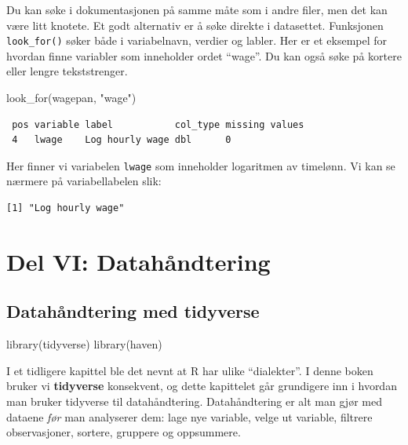 \documentclass[
  norsk,
  letterpaper,
  DIV=11,
  numbers=noendperiod]{scrreprt}
\newenvironment{Shaded}{\begin{snugshade}}{\end{snugshade}}
\newcommand{\FunctionTok}[1]{\textcolor[rgb]{0.28,0.35,0.67}{#1}}
\newcommand{\NormalTok}[1]{\textcolor[rgb]{0.00,0.23,0.31}{#1}}
\newcommand{\SpecialCharTok}[1]{\textcolor[rgb]{0.37,0.37,0.37}{#1}}
\newcommand{\StringTok}[1]{\textcolor[rgb]{0.13,0.47,0.30}{#1}}
\theoremstyle{definition}
\theoremstyle{remark}
\begin{document}
Du kan søke i dokumentasjonen på samme måte som i andre filer, men det
kan være litt knotete. Et godt alternativ er å søke direkte i
datasettet. Funksjonen \texttt{look\_for()} søker både i variabelnavn,
verdier og labler. Her er et eksempel for hvordan finne variabler som
inneholder ordet ``wage''. Du kan også søke på kortere eller lengre
tekststrenger.

\begin{Shaded}
\begin{Highlighting}[]
\FunctionTok{look\_for}\NormalTok{(wagepan, }\StringTok{"wage"}\NormalTok{)}
\end{Highlighting}
\end{Shaded}

\begin{verbatim}
 pos variable label           col_type missing values
 4   lwage    Log hourly wage dbl      0             
\end{verbatim}

Her finner vi variabelen \texttt{lwage} som inneholder logaritmen av
timelønn. Vi kan se nærmere på variabellabelen slik:

\begin{Shaded}
\end{Shaded}

\begin{verbatim}
[1] "Log hourly wage"
\end{verbatim}

\part{Del VI: Datahåndtering}

\chapter{Datahåndtering med
tidyverse}\label{datahuxe5ndtering-med-tidyverse}

\begin{Shaded}
\begin{Highlighting}[]
\FunctionTok{library}\NormalTok{(tidyverse)}
\FunctionTok{library}\NormalTok{(haven)}
\end{Highlighting}
\end{Shaded}

I et tidligere kapittel ble det nevnt at R har ulike ``dialekter''. I
denne boken bruker vi \textbf{tidyverse} konsekvent, og dette kapittelet
går grundigere inn i hvordan man bruker tidyverse til datahåndtering.
Datahåndtering er alt man gjør med dataene \emph{før} man analyserer
dem: lage nye variable, velge ut variable, filtrere observasjoner,
sortere, gruppere og oppsummere.
\end{document}
